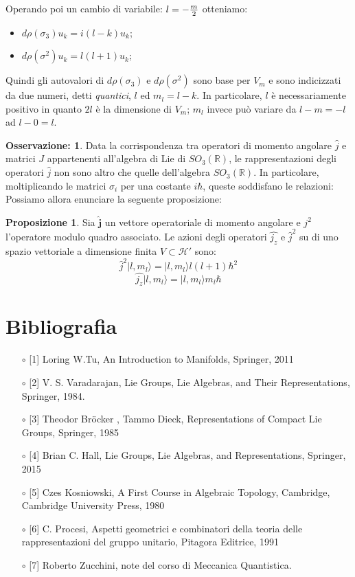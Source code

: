 \documentclass[12pt,a4paper]{report}
\theoremstyle{definition}
\theoremstyle{Theorem}
\newtheorem{Prop}[Def]{Proposizione}
\theoremstyle{definition}
\theoremstyle{definition}
\theoremstyle{definition}
\newtheorem{Obs}[Def]{Osservazione:}
\begin{document}
Operando poi un cambio di variabile: $l=-{m\over2}$ otteniamo:
\begin{itemize}
	\centering
	\item $d\rho(\sigma_3)u_k=i(l-k)u_k$;
	\item $d\rho(\sigma^2)u_k=l(l+1)u_k$;
\end{itemize}
Quindi gli autovalori di $d\rho(\sigma_3)$ e $d\rho(\sigma^2)$ sono base per $V_m$ e sono indicizzati da due numeri, detti \textit{quantici}, $l$ ed $m_l=l-k$. In particolare, $l$ è necessariamente positivo in quanto $2l$ è la dimensione di $V_m$; $m_l$ invece può variare da $l-m=-l$ ad $l-0=l$.
\begin{Obs}
	Data la corrispondenza tra operatori di momento angolare $\hat{j}$ e matrici $J$ appartenenti all'algebra di Lie di $SO_3(\mathbb{R})$, le rappresentazioni degli operatori $\hat{j}$ non sono altro che quelle dell'algebra $SO_3(\mathbb{R})$. In particolare, moltiplicando le matrici $\sigma_i$ per una costante $i\hbar$, queste soddisfano le relazioni:
	Possiamo allora enunciare la seguente proposizione:
\end{Obs}
\begin{Prop}
	Sia $\hat{\textbf{j}}$ un vettore operatoriale di momento angolare e $j^2$ l'operatore modulo quadro associato. Le azioni degli operatori $\hat{j_z}$ e $\hat{j}^2$ su di uno spazio vettoriale a dimensione finita $V\subset \mathcal{H'}$ sono:
	$$\hat{j}^2|l,m_l\rangle=|l,m_l\rangle l(l+1)\hbar^2$$ 
	$$\hat{j_z}|l,m_l\rangle=|l,m_l\rangle m_l\hbar$$
\end{Prop}
\chapter*{Bibliografia}
\begin{itemize}
	\item[$\circ$] [1] Loring W.Tu, An Introduction to Manifolds, Springer, 2011
	\item[$\circ$] [2] V. S. Varadarajan, Lie Groups, Lie Algebras, and Their Representations, Springer,
	1984.
	\item[$\circ$] [3] Theodor Bröcker , Tammo Dieck, Representations of Compact Lie Groups, Springer, 1985
	\item[$\circ$] [4] Brian C. Hall, Lie Groups, Lie Algebras, and Representations, Springer, 2015
	\item [$\circ$] [5] Czes Kosniowski, A First Course in Algebraic Topology, Cambridge, Cambridge University Press, 1980
	\item [$\circ$] [6] C. Procesi, Aspetti geometrici e combinatori della teoria delle rappresentazioni del gruppo unitario, Pitagora Editrice, 1991
	\item [$\circ$] [7] Roberto Zucchini, note del corso di Meccanica Quantistica.
\end{itemize}
\end{document}
